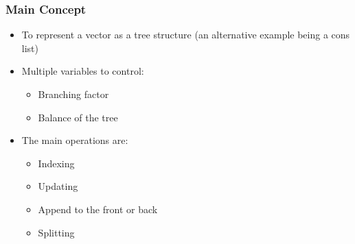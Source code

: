\documentclass{beamer}
\begin{document}
\begin{frame}
\frametitle{Main Concept}


\begin{itemize}

	\item To represent a vector as a tree structure (an alternative example being a cons list) \pause
	\item Multiple variables to control:
		\begin{itemize}
			\item Branching factor
			\item Balance of the tree
		\end{itemize}
	\pause
	\item The main operations are:
	\noindent\parbox[t]{2.4in}{\raggedright%
		\begin{itemize}
			\item Indexing
			\item Updating
		\end{itemize}
	}%
	\noindent\parbox[t]{2.4in}{\raggedright%
		\begin{itemize}
			\item Append to the front or back
			\item Splitting
		\end{itemize}
	}%

\end{itemize}

\end{frame}
\end{document}
